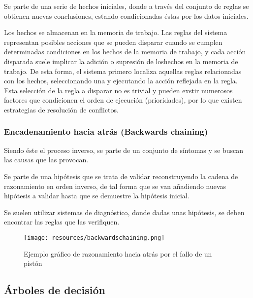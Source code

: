 \documentclass[a4paper, 11pt, titlepage]{article}
\begin{document}
            Se parte de una serie de hechos iniciales, donde a través del conjunto de reglas se 
            obtienen nuevas conclusiones, estando condicionadas éstas por los datos iniciales.

            Los hechos se almacenan en la memoria de trabajo. Las reglas del sistema representan 
            posibles acciones que se pueden disparar cuando se cumplen determinadas condiciones
            en los hechos de la memoria de trabajo, y cada acción disparada suele implicar la adición 
            o supresión de loshechos en la memoria de trabajo. De esta forma, el sistema primero 
            localiza aquellas reglas relacionadas con los hechos, seleccionando una y ejecutando la 
            acción reflejada en la regla. Esta selección de la regla a disparar no es trivial y 
            pueden exstir numerosos factores que condicionen el orden de ejecución (prioridades), 
            por lo que existen estrategias de resolución de conflictos.

        \subsubsection{Encadenamiento hacia atrás (Backwards chaining)}\label{encadenamiento_atras}

            Siendo éste el proceso inverso, se parte de un conjunto de síntomas y se buscan 
            las causas que las provocan.

            Se parte de una hipótesis que se trata de validar reconstruyendo la cadena de 
            razonamiento en orden inverso, de tal forma que se van añadiendo nuevas hipótesis 
            a validar hasta que se demuestre la hipótesis inicial.

            Se suelen utilizar sistemas de diagnóstico, donde dadas unas hipótesis, se deben 
            encontrar las reglas que las verifiquen.

            \begin{figure}[htp]
                \centering
                \texttt{[image: resources/backwardschaining.png]}
                \caption{Ejemplo gráfico de razonamiento hacia atrás por el fallo de un pistón}
                \label{backwardschaining}
            \end{figure}    

    \subsection{Árboles de decisión}
\end{document}
